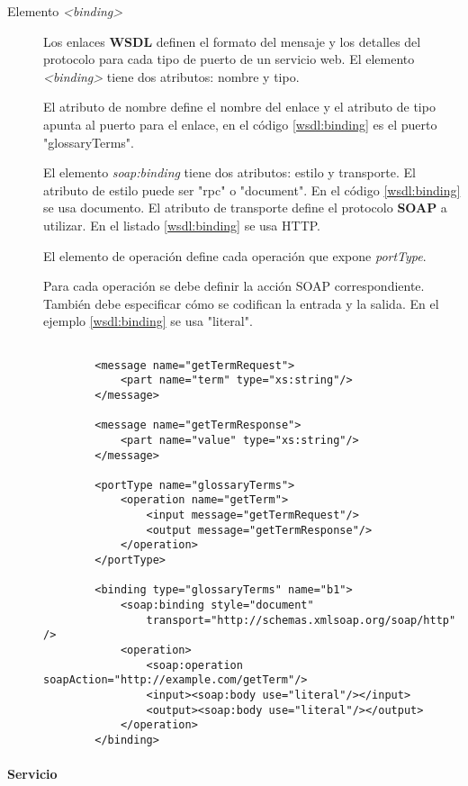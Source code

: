 \begin{description}
 	
 	
 	\item [Elemento \textit{<binding>}]
 	Los enlaces \textbf{WSDL} definen el formato del mensaje y los detalles del protocolo para cada tipo de puerto de un servicio web.  	El elemento \textit{<binding>} tiene dos atributos: nombre y tipo.
 	
 	El atributo de nombre define el nombre del enlace y el atributo de tipo apunta al puerto para el enlace, en el  c\'odigo \ref{wsdl:binding} es el puerto "glossaryTerms".
 	
 	El elemento\textit{ soap:binding} tiene dos atributos: estilo y transporte.  	
 	El atributo de estilo puede ser "rpc" o "document". En el c\'odigo \ref{wsdl:binding}  se usa documento. El atributo de transporte define el protocolo \textbf{SOAP} a utilizar. En el listado \ref{wsdl:binding} se usa HTTP.
 	
 	El elemento de operación define cada operación que expone \textit{portType}.
 	
 	Para cada operación se debe definir la acción SOAP correspondiente. También debe especificar cómo se codifican la entrada y la salida. En el ejemplo \ref{wsdl:binding} se usa "literal".
 		
 		\begin{lstlisting}[label=wsdl:binding, caption= Binding. Tomado de \cite{W3C2022}] 
 		
 		<message name="getTermRequest">
 			<part name="term" type="xs:string"/>
 		</message>
 		
 		<message name="getTermResponse">
 			<part name="value" type="xs:string"/>
 		</message>
 		
 		<portType name="glossaryTerms">
 			<operation name="getTerm">
 				<input message="getTermRequest"/>
 				<output message="getTermResponse"/>
 			</operation>
 		</portType>
 		
 		<binding type="glossaryTerms" name="b1">
 			<soap:binding style="document"
 				transport="http://schemas.xmlsoap.org/soap/http" />
 			<operation>
 				<soap:operation soapAction="http://example.com/getTerm"/>
 				<input><soap:body use="literal"/></input>
 				<output><soap:body use="literal"/></output>
 			</operation>
 		</binding> 
 		\end{lstlisting}  
 	
 	\end{description}
 	
 
  
  \paragraph{Servicio}
  
